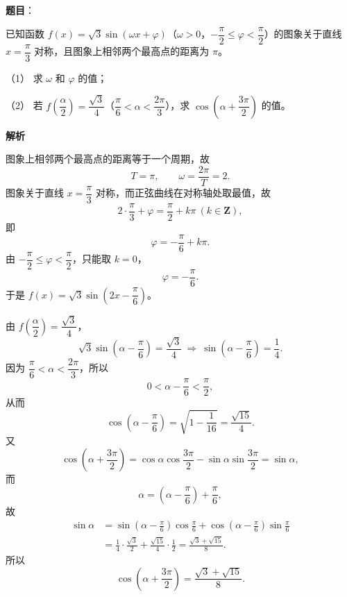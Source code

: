 \begin{answer}

\textbf{题目}：

已知函数 $f(x)=\sqrt3\sin(\omega x+\varphi)$（$\omega>0$，$-\dfrac\pi2\leqslant\varphi<\dfrac\pi2$）的图象关于直线 $x=\dfrac\pi3$ 对称，且图象上相邻两个最高点的距离为 $\pi$。

（1） 求 $\omega$ 和 $\varphi$ 的值；

（2） 若 $f\left(\dfrac\alpha2\right)=\dfrac{\sqrt3}4$（$\dfrac\pi6<\alpha<\dfrac{2\pi}3$），求 $\cos\left(\alpha+\dfrac{3\pi}2\right)$ 的值。

\textbf{解析}


图象上相邻两个最高点的距离等于一个周期，故
\nopagebreak[4]
\[T=\pi,\qquad \omega=\frac{2\pi}T=2 .\]
图象关于直线 $x=\dfrac\pi3$ 对称，而正弦曲线在对称轴处取最值，故
\nopagebreak[4]
\[2\cdot\frac\pi3+\varphi=\frac\pi2+k\pi\ (k\in\mathbf Z),\]
即
\nopagebreak[4]
\[\varphi=-\frac\pi6+k\pi .\]
由 $-\dfrac\pi2\leqslant\varphi<\dfrac\pi2$，只能取 $k=0$，
\nopagebreak[4]
\[\varphi=-\frac\pi6 .\]
于是 $f(x)=\sqrt3\sin\left(2x-\dfrac\pi6\right)$。


由 $f\left(\dfrac\alpha2\right)=\dfrac{\sqrt3}4$，
\nopagebreak[4]
\[\sqrt3\sin\left(\alpha-\frac\pi6\right)=\frac{\sqrt3}4
\ \Longrightarrow\ \sin\left(\alpha-\frac\pi6\right)=\frac14 .\]
因为 $\dfrac\pi6<\alpha<\dfrac{2\pi}3$，所以
\nopagebreak[4]
\[0<\alpha-\frac\pi6<\frac\pi2,\]
从而
\nopagebreak[4]
\[\cos\left(\alpha-\frac\pi6\right)=\sqrt{1-\frac1{16}}=\frac{\sqrt{15}}4 .\]
又
\nopagebreak[4]
\[\cos\left(\alpha+\frac{3\pi}2\right)=\cos\alpha\cos\frac{3\pi}2-\sin\alpha\sin\frac{3\pi}2=\sin\alpha,\]
而
\nopagebreak[4]
\[\alpha=\left(\alpha-\frac\pi6\right)+\frac\pi6,\]
故
\nopagebreak[4]
\[\begin{aligned}
\sin\alpha
&=\sin\left(\alpha-\frac\pi6\right)\cos\frac\pi6+\cos\left(\alpha-\frac\pi6\right)\sin\frac\pi6\\
&=\frac14\cdot\frac{\sqrt3}2+\frac{\sqrt{15}}4\cdot\frac12
=\frac{\sqrt3+\sqrt{15}}8 .
\end{aligned}\]
所以
\nopagebreak[4]
\[\cos\left(\alpha+\frac{3\pi}2\right)=\frac{\sqrt3+\sqrt{15}}8 .\]



\end{answer}
